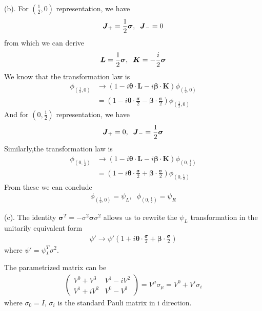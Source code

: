 \documentclass{article}
\newcommand{\bm}[1]{\boldsymbol{#1}}
\begin{document}
\quad(b). For $(\frac{1}{2},0)$ representation, we have
\begin{align*}
  \bm{J}_+=\frac{1}{2}\vb{\bm{\sigma}},\;\;\bm{J}_-=0
\end{align*}
from which we can derive
\begin{align*}
  \bm{L}=\frac{1}{2}\vb{\bm{\sigma}},\;\;\bm{K}=-\frac{i}{2}\vb{\bm{\sigma}}
\end{align*}
We know that the transformation law is
\begin{align*}
  \phi_{(\frac{1}{2},0)}&\rightarrow(1-i\bm{\theta}\cdot \bm{L}-i\bm{\beta}\cdot \bm{K})\phi_{(\frac{1}{2},0)}\\
  &=(1-i\bm{\theta}\cdot \frac{\bm{\sigma}}{2}-\bm{\beta}\cdot \frac{\bm{\sigma}}{2})\phi_{(\frac{1}{2},0)}
\end{align*}
And for $(0,\frac{1}{2})$ representation, we have
\begin{align*}
  \bm{J}_+=0,\;\;\bm{J}_-=\frac{1}{2}\vb{\bm{\sigma}}
\end{align*}
Similarly,the transformation law is
\begin{align*}
  \phi_{(0,\frac{1}{2})}&\rightarrow(1-i\bm{\theta}\cdot \bm{L}-i\bm{\beta}\cdot \bm{K})\phi_{(0,\frac{1}{2})}\\
    &=(1-i\bm{\theta}\cdot \frac{\bm{\sigma}}{2}+\bm{\beta}\cdot \frac{\bm{\sigma}}{2})\phi_{(0,\frac{1}{2})}
\end{align*}
From these we can conclude
\begin{align*}
  \phi_{(\frac{1}{2},0)}=\psi_L,\;\;\phi_{(0,\frac{1}{2})}=\psi_R
\end{align*}

\quad(c). The identity $\bm{\sigma}^T=-\sigma^2\boldsymbol{\sigma}\sigma^2$ allows us to rewrite the $\psi_L$ transformation in the unitarily equivalent form
\begin{align}
  \psi'\rightarrow\psi'(1+i\bm{\theta}\cdot \frac{\bm{\sigma}}{2}+\bm{\beta}\cdot\frac{\bm{\sigma}}{2})
\end{align}
where $\psi'=\psi_L^T\sigma^2$.

The parametrized matrix can be
\begin{align*}
  \begin{pmatrix}
    V^0+V^3&V^1-iV^2\\
    V^1+iV^2&V^0-V^3
  \end{pmatrix}
  =V^{\mu}\sigma_{\mu}=V^0+V^i\sigma_i
\end{align*}
where $\sigma_0=I$, $\sigma_i$ is the standard Pauli matrix in i direction.
\end{document}
